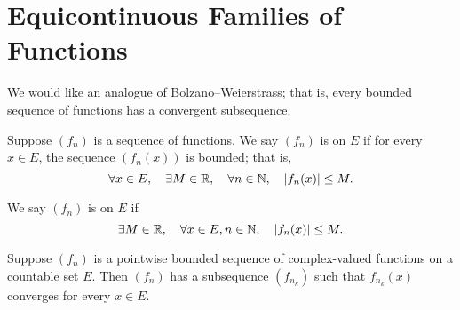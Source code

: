 \section{Equicontinuous Families of Functions}
We would like an analogue of Bolzano--Weierstrass; that is, every bounded sequence of functions has a convergent subsequence.

\begin{definition}
Suppose $(f_n)$ is a sequence of functions. We say $(f_n)$ is  on $E$ if for every $x\in E$, the sequence $(f_n(x))$ is bounded; that is,
\[\forall x\in E,\quad\exists M\in\mathbb R,\quad\forall n\in\mathbb N,\quad |f_n(x)|\le M.\]

We say $(f_n)$ is  on $E$ if
\[\exists M\in\mathbb R,\quad\forall x\in E,n\in\mathbb N,\quad |f_n(x)|\le M.\]
\end{definition}

\begin{lemma}
Suppose $(f_n)$ is a pointwise bounded sequence of complex-valued functions on a countable set $E$. Then $(f_n)$ has a subsequence $(f_{n_k})$ such that $f_{n_k}(x)$ converges for every $x\in E$.
\end{lemma}

